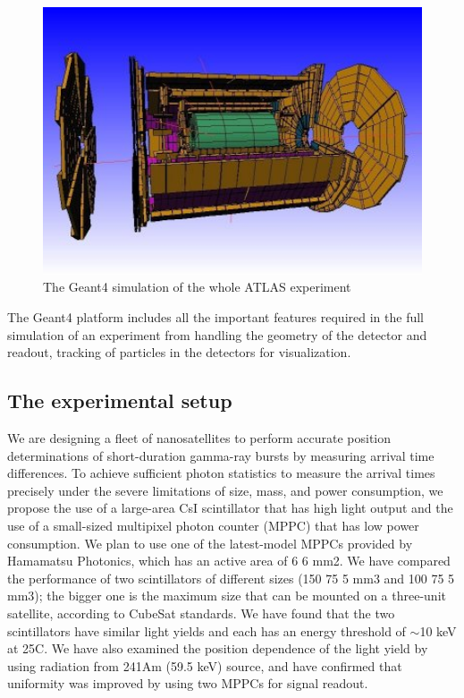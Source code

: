 \documentclass[12pt, a4paper,titlepage]{article}
\numberwithin{equation}{section}
\numberwithin{figure}{section}
\begin{document}
\begin{figure}[H]
\centering
\includegraphics[width=130.0mm]{images/AtlasHalf.jpg}
\caption{The Geant4 simulation of the whole ATLAS experiment}
\end{figure}

The Geant4 platform includes all the important features required in the full simulation of an experiment from handling the geometry of the detector and readout, tracking of particles in the detectors for visualization.

\subsection{The experimental setup}


We are designing a fleet of nanosatellites to perform accurate position determinations
of short-duration gamma-ray bursts by measuring arrival time differences.
To achieve sufficient photon statistics to measure the arrival times
precisely under the severe limitations of size, mass, and power consumption,
we propose the use of a large-area CsI scintillator that has high light output
and the use of a small-sized multipixel photon counter (MPPC) that has low
power consumption. We plan to use one of the latest-model MPPCs provided
by Hamamatsu Photonics, which has an active area of 6  6 mm2. We have compared the performance of two scintillators of different sizes (150  75  5 mm3 and 100  75  5 mm3); the bigger one is the maximum size that can be mounted on a three-unit satellite, according to CubeSat standards.
We have found that the two scintillators have similar light yields and each has an energy threshold of $\sim$10 keV at 25C. We have also examined the position dependence of the light yield by using radiation from 241Am (59.5 keV) source, and have confirmed that uniformity was improved by using two MPPCs for signal readout. 
\end{document}
